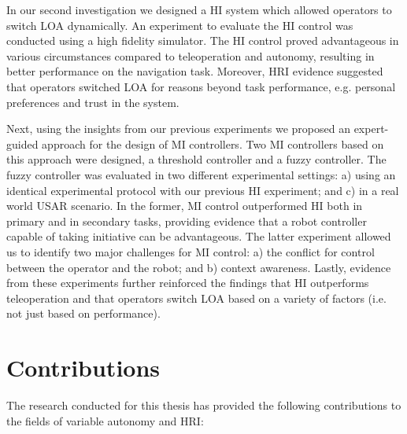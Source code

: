 \documentclass[a4paper,12pt,oneside,openright]{bhamthesis}
\begin{document}
In our second investigation we designed a HI system which allowed operators to switch LOA dynamically. An experiment to evaluate the HI control was conducted using a high fidelity simulator. The HI control proved advantageous in various circumstances compared to teleoperation and autonomy, resulting in better performance on the navigation task. Moreover, HRI evidence suggested that operators switched LOA for reasons beyond task performance, e.g. personal preferences and trust in the system.  

Next, using the insights from our previous experiments we proposed an expert-guided approach for the design of MI controllers. Two MI controllers based on this approach were designed, a threshold controller and a fuzzy controller. The fuzzy controller was evaluated in two different experimental settings: a) using an identical experimental protocol with our previous HI experiment; and c) in a real world USAR scenario. In the former, MI control outperformed HI both in primary and in secondary tasks, providing evidence that a robot controller capable of taking initiative can be advantageous. The latter experiment allowed us to identify two major challenges for MI control: a) the conflict for control between the operator and the robot; and b) context awareness. Lastly, evidence from these experiments further reinforced the findings that HI outperforms teleoperation and that operators switch LOA based on a variety of factors (i.e. not just based on performance). 

\section{Contributions}
The research conducted for this thesis has provided the following contributions to the fields of variable autonomy and HRI:
\end{document}
